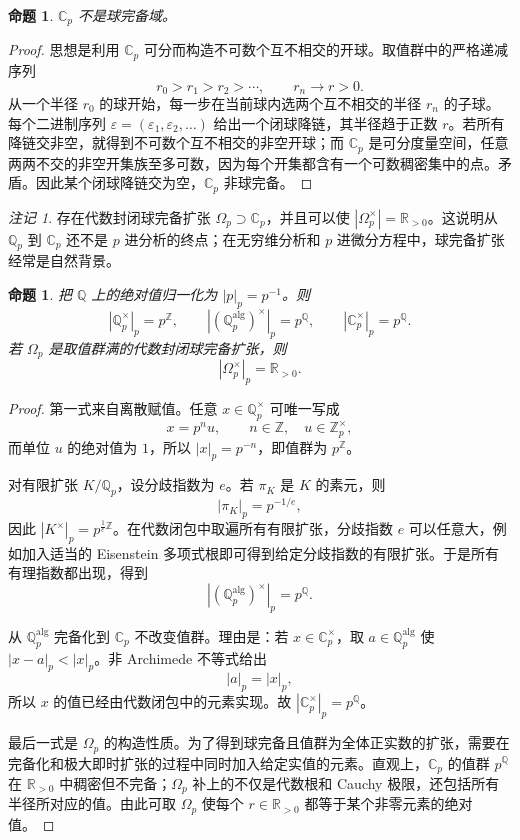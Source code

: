 \documentclass[11pt,a4paper,openany]{ctexbook}
\numberwithin{equation}{chapter}
\newcommand{\Q}{\mathbb{Q}}
\newcommand{\R}{\mathbb{R}}
\newcommand{\C}{\mathbb{C}}
\newcommand{\Z}{\mathbb{Z}}
\theoremstyle{plain}
\newtheorem{proposition}[theorem]{命题}
\theoremstyle{definition}
\theoremstyle{remark}
\newtheorem{remark}[theorem]{注记}
\begin{document}
\begin{proposition}
$\C_p$ 不是球完备域。
\end{proposition}

\begin{proof}
思想是利用 $\C_p$ 可分而构造不可数个互不相交的开球。取值群中的严格递减序列
\[
  r_0>r_1>r_2>\cdots,\qquad r_n\to r>0.
\]
从一个半径 $r_0$ 的球开始，每一步在当前球内选两个互不相交的半径 $r_n$ 的子球。每个二进制序列 $\varepsilon=(\varepsilon_1,\varepsilon_2,\ldots)$ 给出一个闭球降链，其半径趋于正数 $r$。若所有降链交非空，就得到不可数个互不相交的非空开球；而 $\C_p$ 是可分度量空间，任意两两不交的非空开集族至多可数，因为每个开集都含有一个可数稠密集中的点。矛盾。因此某个闭球降链交为空，$\C_p$ 非球完备。
\end{proof}

\begin{remark}
存在代数封闭球完备扩张 $\Omega_p\supset\C_p$，并且可以使 $|\Omega_p^\times|=\R_{>0}$。这说明从 $\Q_p$ 到 $\C_p$ 还不是 $p$ 进分析的终点；在无穷维分析和 $p$ 进微分方程中，球完备扩张经常是自然背景。
\end{remark}

\begin{proposition}
把 $\Q$ 上的绝对值归一化为 $|p|_p=p^{-1}$。则
\[
|\Q_p^\times|_p=p^\Z,\qquad |(\Q_p^{\mathrm{alg}})^\times|_p=p^\Q,\qquad
|\C_p^\times|_p=p^\Q.
\]
若 $\Omega_p$ 是取值群满的代数封闭球完备扩张，则
\[
|\Omega_p^\times|_p=\R_{>0}.
\]
\end{proposition}

\begin{proof}
第一式来自离散赋值。任意 $x\in\Q_p^\times$ 可唯一写成
\[
x=p^nu,\qquad n\in\Z,\quad u\in\Z_p^\times,
\]
而单位 $u$ 的绝对值为 $1$，所以 $|x|_p=p^{-n}$，即值群为 $p^\Z$。

对有限扩张 $K/\Q_p$，设分歧指数为 $e$。若 $\pi_K$ 是 $K$ 的素元，则
\[
|\pi_K|_p=p^{-1/e},
\]
因此 $|K^\times|_p=p^{\frac1e\Z}$。在代数闭包中取遍所有有限扩张，分歧指数 $e$ 可以任意大，例如加入适当的 Eisenstein 多项式根即可得到给定分歧指数的有限扩张。于是所有有理指数都出现，得到
\[
|(\Q_p^{\mathrm{alg}})^\times|_p=p^\Q.
\]

从 $\Q_p^{\mathrm{alg}}$ 完备化到 $\C_p$ 不改变值群。理由是：若 $x\in\C_p^\times$，取 $a\in\Q_p^{\mathrm{alg}}$ 使 $|x-a|_p<|x|_p$。非 Archimede 不等式给出
\[
|a|_p=|x|_p,
\]
所以 $x$ 的值已经由代数闭包中的元素实现。故 $|\C_p^\times|_p=p^\Q$。

最后一式是 $\Omega_p$ 的构造性质。为了得到球完备且值群为全体正实数的扩张，需要在完备化和极大即时扩张的过程中同时加入给定实值的元素。直观上，$\C_p$ 的值群 $p^\Q$ 在 $\R_{>0}$ 中稠密但不完备；$\Omega_p$ 补上的不仅是代数根和 Cauchy 极限，还包括所有半径所对应的值。由此可取 $\Omega_p$ 使每个 $r\in\R_{>0}$ 都等于某个非零元素的绝对值。
\end{proof}
\end{document}
